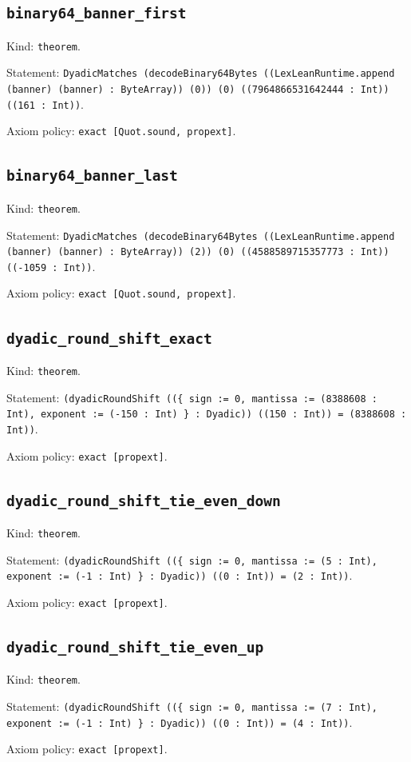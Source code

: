 \documentclass[11pt]{article}
\begin{document}
\subsection*{\texttt{binary64\_banner\_first}}
\noindent Kind: \texttt{theorem}.\par
\noindent Statement: \texttt{DyadicMatches (decodeBinary64Bytes ((LexLeanRuntime.append (banner) (banner) : ByteArray)) (0)) (0) ((7964866531642444 : Int)) ((161 : Int))}.\par
\noindent Axiom policy: \texttt{exact [Quot.sound, propext]}.\par
\subsection*{\texttt{binary64\_banner\_last}}
\noindent Kind: \texttt{theorem}.\par
\noindent Statement: \texttt{DyadicMatches (decodeBinary64Bytes ((LexLeanRuntime.append (banner) (banner) : ByteArray)) (2)) (0) ((4588589715357773 : Int)) ((-1059 : Int))}.\par
\noindent Axiom policy: \texttt{exact [Quot.sound, propext]}.\par
\subsection*{\texttt{dyadic\_round\_shift\_exact}}
\noindent Kind: \texttt{theorem}.\par
\noindent Statement: \texttt{(dyadicRoundShift ((\{ sign := 0, mantissa := (8388608 : Int), exponent := (-150 : Int) \} : Dyadic)) ((150 : Int)) = (8388608 : Int))}.\par
\noindent Axiom policy: \texttt{exact [propext]}.\par
\subsection*{\texttt{dyadic\_round\_shift\_tie\_even\_down}}
\noindent Kind: \texttt{theorem}.\par
\noindent Statement: \texttt{(dyadicRoundShift ((\{ sign := 0, mantissa := (5 : Int), exponent := (-1 : Int) \} : Dyadic)) ((0 : Int)) = (2 : Int))}.\par
\noindent Axiom policy: \texttt{exact [propext]}.\par
\subsection*{\texttt{dyadic\_round\_shift\_tie\_even\_up}}
\noindent Kind: \texttt{theorem}.\par
\noindent Statement: \texttt{(dyadicRoundShift ((\{ sign := 0, mantissa := (7 : Int), exponent := (-1 : Int) \} : Dyadic)) ((0 : Int)) = (4 : Int))}.\par
\noindent Axiom policy: \texttt{exact [propext]}.\par
\end{document}
